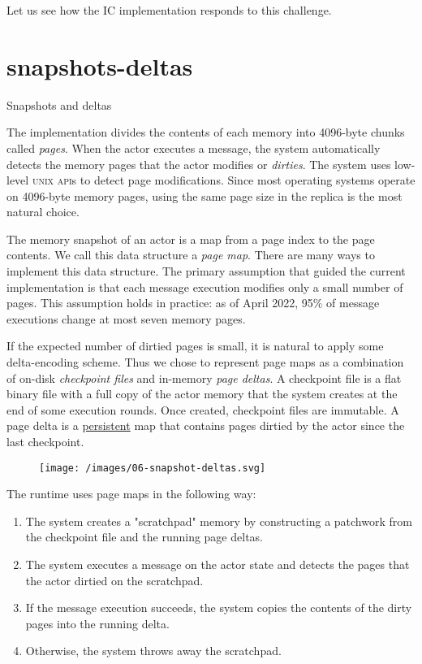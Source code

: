 \documentclass{article}
\begin{document}
Let us see how the IC implementation responds to this challenge.

\section{snapshots-deltas}{Snapshots and deltas}

The implementation divides the contents of each memory into 4096-byte chunks called \emph{pages}.
When the actor executes a message, the system automatically detects the memory pages that the actor modifies or \emph{dirties}.
The system uses low-level \textsc{unix api}s to detect page modifications.
Since most operating systems operate on 4096-byte memory pages, using the same page size in the replica is the most natural choice.

The memory snapshot of an actor is a map from a page index to the page contents.
We call this data structure a \emph{page map}.
There are many ways to implement this data structure.
The primary assumption that guided the current implementation is that each message execution modifies only a small number of pages.
This assumption holds in practice: as of April 2022, 95\% of message executions change at most seven memory pages.

If the expected number of dirtied pages is small, it is natural to apply some delta-encoding scheme.
Thus we chose to represent page maps as a combination of on-disk \emph{checkpoint files} and in-memory \emph{page deltas}.
A checkpoint file is a flat binary file with a full copy of the actor memory that the system creates at the end of some execution rounds.
Once created, checkpoint files are immutable.
A page delta is a \href{https://en.wikipedia.org/wiki/Persistent_data_structure}{persistent} map that contains pages dirtied by the actor since the last checkpoint.

\begin{figure}[grayscale-diagram]
\texttt{[image: /images/06-snapshot-deltas.svg]}
\end{figure}

The runtime uses page maps in the following way:
\begin{enumerate}
  \item The system creates a "scratchpad" memory by constructing a patchwork from the checkpoint file and the running page deltas.
  \item The system executes a message on the actor state and detects the pages that the actor dirtied on the scratchpad.
  \item If the message execution succeeds, the system copies the contents of the dirty pages into the running delta.
  \item Otherwise, the system throws away the scratchpad.
\end{enumerate}
\end{document}
